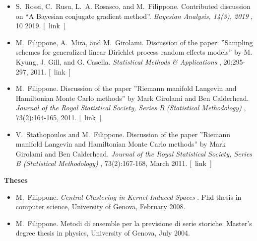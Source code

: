 \documentclass[10pt]{article}
\begin{document}
\begin{itemize}
\item 

  S. Rossi, C. Rusu, L. A. Rosasco, and M. Filippone. Contributed discussion on ``A Bayesian conjugate gradient method''. \emph{Bayesian Analysis, 14(3), 2019}
, 10 2019. [ link ] 

\item 

  M. Filippone, A. Mira, and M. Girolami. Discussion of the paper: ”Sampling schemes for generalized linear Dirichlet process random effects models” by M. Kyung, J. Gill, and G. Casella. \emph{Statistical Methods \& Applications}
, 20:295-297, 2011. [ link ] 

\item 

  M. Filippone. Discussion of the paper ”Riemann manifold Langevin and Hamiltonian Monte Carlo methods” by Mark Girolami and Ben Calderhead. \emph{Journal of the Royal Statistical Society, Series B (Statistical Methodology)}
, 73(2):164-165, 2011. [ link ] 

\item 

  V. Stathopoulos and M. Filippone. Discussion of the paper ”Riemann manifold Langevin and Hamiltonian Monte Carlo methods” by Mark Girolami and Ben Calderhead. \emph{Journal of the Royal Statistical Society, Series B (Statistical Methodology)}
, 73(2):167-168, March 2011. [ link ] 


\end{itemize}
\textbf{Theses}
\begin{itemize}
\item 

  M. Filippone. \emph{Central Clustering in Kernel-Induced Spaces}
. Phd thesis in computer science, University of Genova, February 2008. 

\item 

  M. Filippone. Metodi di ensemble per la previsione di serie storiche. Master's degree thesis in physics, University of Genova, July 2004. 


\end{itemize}
\end{document}
